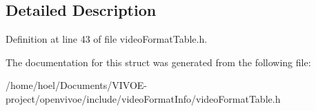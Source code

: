 \subsection{Detailed Description}


Definition at line 43 of file video\+Format\+Table.\+h.



The documentation for this struct was generated from the following file\+:\begin{DoxyCompactItemize}
\item 
/home/hoel/\+Documents/\+V\+I\+V\+O\+E-\/project/openvivoe/include/video\+Format\+Info/video\+Format\+Table.\+h\end{DoxyCompactItemize}
